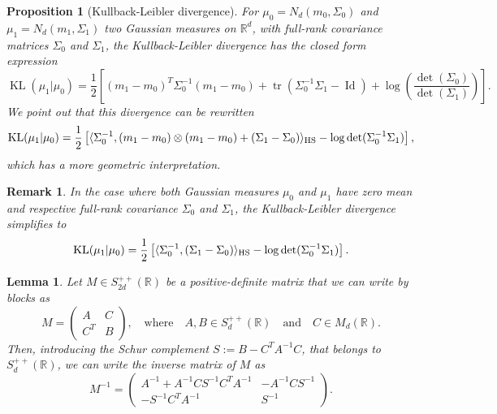 \documentclass[]{article}
\DeclareMathOperator{\KL}{KL}
\DeclareMathOperator{\tr}{tr}
\DeclareMathOperator{\Id}{Id}
\numberwithin{equation}{section}
\theoremstyle{plain}
\newtheorem{rem}{Remark}[section]
\newtheorem{prop}{Proposition}[section]
\newtheorem{lem}{Lemma}[section]
\begin{document}
{\begin{prop}[Kullback-Leibler divergence]\cite[p.~33, ex.~11]{pardo2018statistical}\label{prop:kl_gaussian}
	For $\mu_0 = N_d(m_0,\Sigma_0)$ and $\mu_1 = N_d(m_1, \Sigma_1)$ two Gaussian measures on $\mathbb{R}^d$, with full-rank covariance matrices $\Sigma_0$ and $\Sigma_1$, the Kullback-Leibler divergence has the closed form expression
	\begin{equation}
		\KL(\mu_1 |\mu_0) = \frac{1}{2} \left[ (m_1 - m_0)^T \Sigma_0^{-1}(m_1 - m_0) + \tr(\Sigma_0^{-1} \Sigma_1 - \Id)   + \log\left(\frac{\det(\Sigma_0)}{\det(\Sigma_1)}\right) \right].
	\end{equation}
We point out that this divergence can be rewritten
\begin{equation}\label{eq:}
	\KL(\mu_1 |\mu_0) = \frac{1}{2} \left[ \langle \Sigma_0^{-1},(m_1-m_0) \otimes (m_1 - m_0) + (\Sigma_1 - \Sigma_0)\rangle _{\rm HS} - \log \det(\Sigma_0^{-1} \Sigma_1)\right], 
\end{equation}
which has a more geometric interpretation.
\end{prop} 

\begin{rem}
In the case where both Gaussian measures $\mu_0$ and $\mu_1$ have zero mean and respective full-rank covariance $\Sigma_0$ and $\Sigma_1$, the Kullback-Leibler divergence simplifies to
\begin{equation}\label{eq:kl_centred_gauss}
	\KL(\mu_1 |\mu_0) = \frac{1}{2} \left[ \langle \Sigma_0^{-1},(\Sigma_1 - \Sigma_0)\rangle _{\rm HS} - \log \det(\Sigma_0^{-1} \Sigma_1)\right].
\end{equation}
\end{rem}

\begin{lem}\label{lem:block_inv}\cite[p.~12, eq.~29]{magnus2019matrix}
    Let $M \in S_{2d}^{++}(\mathbb{R})$ be a positive-definite matrix that we can write by blocks as
    \begin{equation*}
        M =\begin{pmatrix}
            A & C \\
            C^T & B
        \end{pmatrix}, \quad \text{where} \quad A, B \in S_{d}^{++}(\mathbb{R}) \quad \text{and} \quad C \in M_d(\mathbb{R}).
    \end{equation*}
    Then, introducing the Schur complement $S := B - C^T A^{-1} C$, that belongs to $S_d^{++}(\mathbb{R})$, we can write the inverse matrix of $M$ as 
    \begin{equation}\label{eq:block_inv}
        M^{-1} = \begin{pmatrix}
            A^{-1} + A^{-1}CS^{-1}C^TA^{-1} & -A^{-1}C S^{-1} \\
            -S^{-1}C^TA^{-1} & S^{-1}
        \end{pmatrix}.
    \end{equation}
\end{lem}

}
\end{document}
